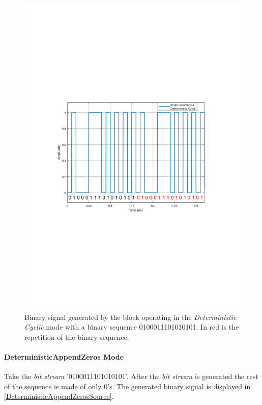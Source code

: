 \begin{figure}[H]
	\centering
	\includegraphics[clip, trim=0.5cm 9cm 0.5cm 9cm, width=\textwidth,scale=0.7]{./lib/binary_source/figures/BinarySource_output_Cyclic.pdf}
	
	\caption{Binary signal generated by the block operating in the \textit{Deterministic Cyclic} mode with a binary sequence 0100011101010101. In red is the repetition of the binary sequence.}\label{DeterministicCyclicSource}
\end{figure}

\pagebreak

\paragraph*{DeterministicAppendZeros Mode}

Take the \textit{bit stream} '0100011101010101'. After the \textit{bit stream} is generated the rest of the sequence is made of only 0's. The generated binary signal is displayed in \ref{DeterministicAppendZerosSource}.

